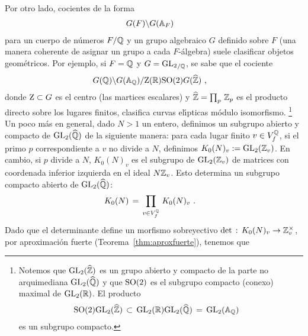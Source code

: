 Por otro lado, cocientes de la forma
\begin{align*}
	& G(F)\backslash G(\adeles{F})
\end{align*}
%
para un cuerpo de n\'{u}meros $F/\bb{Q}$ y un grupo algebraico $G$ definido
sobre $F$ (una manera coherente de asignar un grupo a cada $F$-\'{a}lgebra)
suele clasificar objetos geom\'{e}tricos. Por ejemplo, si $F=\bb{Q}$ y
$G={\GL_{2}}_{/\bb{Q}}$, se sabe que el cociente
\begin{align*}
	& G(\bb{Q})\backslash G(\adeles{\bb{Q}})/
		\centre(\bb{R})\SO{2} G(\Adfin{\bb{Z}})
	\text{ ,}
\end{align*}
%
donde $\centre\subset G$ es el centro (las martices escalares) y
$\Adfin{\bb{Z}}=\prod_{p}\,\bb{Z}_{p}$ es el producto directo sobre los lugares
finitos, clasifica curvas el\'{\i}pticas m\'{o}dulo isomorfismo.%
\footnote{
	Notemos que $\GL_{2}(\Adfin{\bb{Z}})$ es un grupo abierto y compacto de
	la parte no arquimediana $\GL_{2}(\Adfin{\bb{Q}})$ y que $\SO{2}$ es el
	subgrupo compacto (conexo) maximal de $\GL_{2}(\bb{R})$. El producto
	\begin{align*}
		\SO{2}\GL_{2}(\Adfin{\bb{Z}}) & \,\subset\,
			\GL_{2}(\bb{R})\GL_{2}(\Adfin{\bb{Q}}) \,=\,
			\GL_{2}(\adeles{\bb{Q}})
	\end{align*}
	es un subgrupo compacto.
}
Un poco m\'{a}s en general, dado $N>1$ un entero, definimos un subgrupo abierto
y compacto de $\GL_{2}(\Adfin{\bb{Q}})$ de la siguiente manera: para cada lugar
finito $v\in\lugares[f]{\bb{Q}}$, si el primo $p$ correspondiente a $v$ no
divide a $N$, definimos $K_{0}(N)_{v}:=\GL_{2}(\bb{Z}_{v})$. En cambio, si $p$
divide a $N$, $K_{0}(N)_{v}$ es el subgrupo de $\GL_{2}(\bb{Z}_{v})$ de
matrices con coordenada inferior izquierda en el ideal $N\bb{Z}_{v}$. Esto
determina un subgrupo compacto abierto de $\GL_{2}(\Adfin{\bb{Q}})$:
\begin{align*}
	K_{0}(N) & \,=\,\prod_{v\in\lugares[f]{\bb{Q}}}\,K_{0}(N)_{v}
	\text{ .}
\end{align*}
%
Dado que el determinante define un morfismo sobreyectivo
$\det:\,K_{0}(N)_{v}\rightarrow\bb{Z}_{v}^{\times}$, por aproximaci\'{o}n
fuerte (Teorema~\ref{thm:aproxfuerte}), tenemos que%
